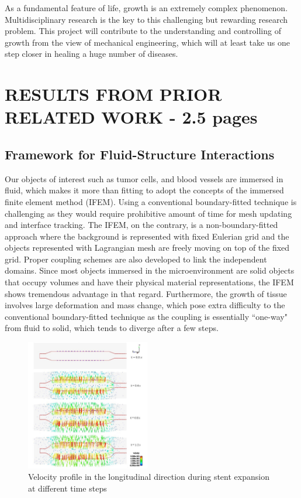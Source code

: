 \documentclass[12pt]{article}
\begin{document}
As a fundamental feature of life, growth is an extremely complex phenomenon. Multidisciplinary research is the key to this challenging but rewarding research problem. This project will contribute to the understanding and controlling of growth from the view of mechanical engineering, which will at least take us one step closer in healing a huge number of diseases.

\section{RESULTS FROM PRIOR RELATED WORK - 2.5 pages}

\subsection{Framework for Fluid-Structure Interactions}
Our objects of interest such as tumor cells, and blood vessels are immersed in fluid, which makes it more than fitting to adopt the concepts of the immersed finite element method (IFEM). Using a conventional boundary-fitted technique is challenging as they would require prohibitive amount of time for mesh updating and interface tracking. The IFEM, on the contrary, is a non-boundary-fitted approach where the background is represented with fixed Eulerian grid and the objects represented with Lagrangian mesh are freely moving on top of the fixed grid. Proper coupling schemes are also developed to link the independent domains. Since most objects immersed in the microenvironment are solid objects that occupy volumes and have their physical material representations, the IFEM shows tremendous advantage in that regard. Furthermore, the growth of tissue involves large deformation and mass change, which pose extra difficulty to the conventional boundary-fitted technique as the coupling is essentially ``one-way"  from fluid to solid, which tends to diverge after a few steps.
\begin{figure}
  \begin{center}
    \includegraphics[width=0.48\textwidth]{./figs/IFEM_stent.jpg}
  \end{center}
  \caption{Velocity profile in the longitudinal direction during stent expansion at different time steps}
  \label{fig:IFEM_stent}
\end{figure}
\end{document}
